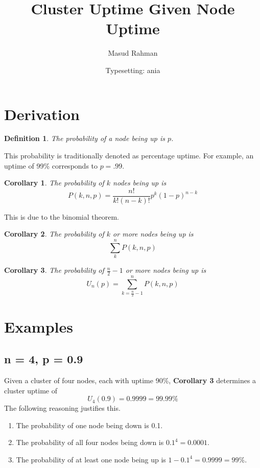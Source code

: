 \documentclass[11pt, oneside]{article}
\title{Cluster Uptime Given Node Uptime}
\author{
  Masud Rahman\\
  \and Typesetting: ania\\
}
\date{}
\newtheorem{defn}{Definition}
\newtheorem{cor}{Corollary}
\begin{document}
\maketitle

\section{Derivation}
\begin{defn}
The probability of a node being up is $p$.
\end{defn}

\noindent This probability is traditionally denoted as percentage uptime. For
example, an uptime of 99\% corresponds to $p=.99$.

\begin{cor}
The probability of $k$ nodes being up is
$$P(k,n,p) = \frac{n!}{k!(n-k)!}p^k(1-p)^{n-k}$$
\end{cor}

\noindent This is due to the binomial theorem.

\begin{cor}
The probability of $k$ or more nodes being up is
$$\sum_{k}^{n} P(k,n,p) $$
\end{cor}

\begin{cor}
The probability of $\frac{n}{2} - 1$ or more nodes being up is
$$ U_n(p) = \sum_{k = \frac{n}{2} - 1 }^{n} P(k,n,p) $$
\end{cor}

\section{Examples}
\subsection{n = 4, p = 0.9}
Given a cluster of four nodes, each with uptime 90\%, \textbf{Corollary 3}
determines a cluster uptime of
$$U_4(0.9) = 0.9999 = 99.99\%$$
The following reasoning justifies this.

\begin{enumerate}
\item The probability of one node being down is 0.1.
\item The probability of all four nodes being down is $0.1^4 = 0.0001$.
\item The probability of at least one node being up is $1 - 0.1^4 = 0.9999 = 99\%$.
\end{enumerate}
\end{document}

